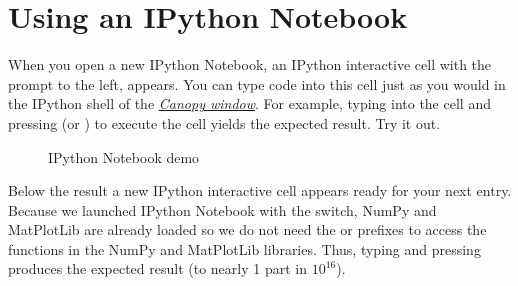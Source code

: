 \documentclass[letterpaper,10pt,english]{sphinxmanual}
\begin{document}
\section{Using an IPython Notebook}
\label{apdx2/apdx2_ipynb:using-an-ipython-notebook}
When you open a new IPython Notebook, an IPython interactive cell with the prompt  to the left, appears.  You can type code into this cell just as you would in the IPython shell of the {\hyperref[chap2/chap2_basics:fig-canopywindow]{\emph{Canopy window}}}.  For example, typing  into the cell and pressing  (or ) to execute the cell yields the expected result.  Try it out.
\begin{figure}[htbp]
\centering
\capstart

\caption{IPython Notebook demo}\label{apdx2/apdx2_ipynb:fig-firstipynbcells}\end{figure}

Below the result a new IPython interactive cell appears ready for your next entry.  Because we launched IPython Notebook with the  switch, NumPy and MatPlotLib are already loaded so we do not need the  or  prefixes to access the functions in the NumPy and MatPlotLib libraries.  Thus, typing  and pressing  produces the expected result (to nearly 1 part in $10^{16}$).
\end{document}

